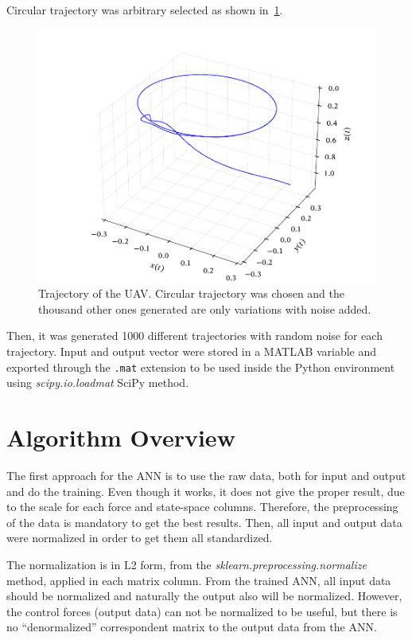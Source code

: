 Circular trajectory was arbitrary selected as shown in~\cref{fig:trajectory}.
\begin{figure}[!htb]
    \centering
    \caption[Trajectory of the UAV]{Trajectory of the UAV. Circular trajectory was chosen and the thousand other ones generated are only variations with noise added.}
    \includegraphics{figures/4results/uav/trajectory.pdf}
    
    \label{fig:trajectory}
\end{figure}
Then, it was generated 1000 different trajectories with random noise for each trajectory.
Input and output vector were stored in a MATLAB variable and exported through the \texttt{.mat} extension to be used inside the Python environment using \emph{scipy.io.loadmat} SciPy method.


\section{Algorithm Overview}

The first approach for the ANN is to use the raw data, both for input and output and do the training.
Even though it works, it does not give the proper result, due to the scale for each force and state-space columns.
Therefore, the preprocessing of the data is mandatory to get the best results.
Then, all input and output data were normalized in order to get them all standardized.

The normalization is in L2 form, from the \emph{sklearn.preprocessing.normalize} method, applied in each matrix column.
From the trained ANN, all input data should be normalized and naturally the output also will be normalized.
However, the control forces (output data) can not be normalized to be useful, but there is no ``denormalized'' correspondent matrix to the output data from the ANN.

